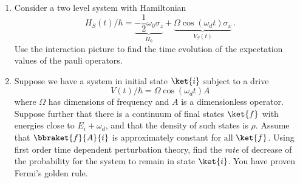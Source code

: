 
\begin{enumerate}
  \item Consider a two level system with Hamiltonian
    \begin{equation}
      H_S(t) / \hbar = \underbrace{-\frac{1}{2} \omega_0 \sigma_z}_{H_0} + \underbrace{\Omega \cos(\omega_d t) \sigma_x}_{V_S(t)}
      \, .
    \end{equation}
    Use the interaction picture to find the time evolution of the expectation values of the pauli operators.
  \item Suppose we have a system in initial state $\ket{i}$ subject to a drive
    \begin{equation} V(t)/\hbar = \Omega \cos(\omega_d t) A \end{equation}
    where $\Omega$ has dimensions of frequency and $A$ is a dimensionless operator.
    Suppose further that there is a continuum of final states $\ket{f}$ with energies close to $E_i + \omega_d$, and that the density of such states is $\rho$.
    Assume that $\bbraket{f}{A}{i}$ is approximately constant for all $\ket{f}$.
    Using first order time dependent perturbation theory, find the \emph{rate} of decrease of the probability for the system to remain in state $\ket{i}$.
    You have proven Fermi's golden rule.
\end{enumerate}

